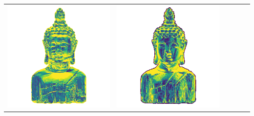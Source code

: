 \begin{tabularx}{\linewidth}{@{}Y@{}Y@{}Y@{}Y@{}Y@{}Y@{}}
\includegraphics[width=\linewidth]{semisynthetic/20150514_16_yu_err.png} &
\includegraphics[width=\linewidth]{semisynthetic/20150514_16_dpsn_err.png} &

\end{tabularx}
